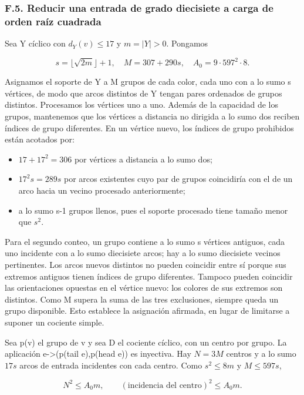 \documentclass[spanish,11pt,a4paper]{article}
\providecommand{\tightlist}{\setlength{\itemsep}{0pt}\setlength{\parskip}{0pt}}
\begin{document}
\subsubsection{F.5. Reducir una entrada de grado diecisiete a carga de orden raíz cuadrada}\label{f.5.-reducir-una-entrada-de-grado-diecisiete-a-carga-de-orden-rauxedz-cuadrada}

Sea Y cíclico con \(d_{Y}(v)\le 17\) y \(m=|Y|>0\). Pongamos

\[s=\lfloor\sqrt{2m}\rfloor+1,\quad M=307+290s,\quad A_0=9\cdot597^2\cdot8.\tag{F.7}\]

Asignamos el soporte de Y a M grupos de cada color, cada uno con a lo sumo s vértices, de modo que arcos distintos de Y tengan pares ordenados de grupos distintos. Procesamos los vértices uno a uno. Además de la capacidad de los grupos, mantenemos que los vértices a distancia no dirigida a lo sumo dos reciben índices de grupo diferentes. En un vértice nuevo, los índices de grupo prohibidos están acotados por:

\begin{itemize}
\tightlist
\item
  \(17+17^{2}=306\) por vértices a distancia a lo sumo dos;
\item
  \(17^2s=289s\) por arcos existentes cuyo par de grupos coincidiría con el de un arco hacia un vecino procesado anteriormente;
\item
  a lo sumo s-1 grupos llenos, pues el soporte procesado tiene tamaño menor que \(s^{2}\).
\end{itemize}

Para el segundo conteo, un grupo contiene a lo sumo s vértices antiguos, cada uno incidente con a lo sumo diecisiete arcos; hay a lo sumo diecisiete vecinos pertinentes. Los arcos nuevos distintos no pueden coincidir entre sí porque sus extremos antiguos tienen índices de grupo diferentes. Tampoco pueden coincidir las orientaciones opuestas en el vértice nuevo: los colores de sus extremos son distintos. Como M supera la suma de las tres exclusiones, siempre queda un grupo disponible. Esto establece la asignación afirmada, en lugar de limitarse a suponer un cociente simple.

Sea p(v) el grupo de v y sea D el cociente cíclico, con un centro por grupo. La aplicación e-\textgreater(p(tail e),p(head e)) es inyectiva. Hay \(N=3M\) centros y a lo sumo \(17s\) arcos de entrada incidentes con cada centro. Como \(s^{2}\le 8m\) y \(M\le 597s\),

\[N^2\le A_0m,\qquad(\text{incidencia del centro})^2\le A_0m.\tag{F.8}\]
\end{document}
